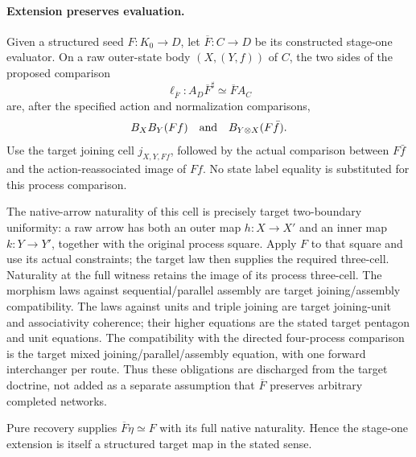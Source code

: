 \documentclass{article}
\begin{document}
\paragraph{Extension preserves evaluation.} Given a structured seed $F:K_0\to D$, let $\overline F:C\to D$ be its constructed stage-one evaluator. On a raw outer-state body $(X,(Y,f))$ of $C$, the two sides of the proposed comparison
\[
 \ell_{\overline F}:A_D\overline F^{\sharp}\simeq\overline F A_C
\]
are, after the specified action and normalization comparisons,
\[
 B_XB_Y(Ff)\quad\hbox{and}\quad B_{Y\otimes X}(F\bar f).
\]
Use the target joining cell $j_{X,Y,Ff}$, followed by the actual comparison between $F\bar f$ and the action-reassociated image of $Ff$. No state label equality is substituted for this process comparison.

The native-arrow naturality of this cell is precisely target two-boundary uniformity: a raw arrow has both an outer map $h:X\to X'$ and an inner map $k:Y\to Y'$, together with the original process square. Apply $F$ to that square and use its actual constraints; the target law then supplies the required three-cell. Naturality at the full witness retains the image of its process three-cell. The morphism laws against sequential/parallel assembly are target joining/assembly compatibility. The laws against units and triple joining are target joining-unit and associativity coherence; their higher equations are the stated target pentagon and unit equations. The compatibility with the directed four-process comparison is the target mixed joining/parallel/assembly equation, with one forward interchanger per route. Thus these obligations are discharged from the target doctrine, not added as a separate assumption that $\overline F$ preserves arbitrary completed networks.

Pure recovery supplies $\overline F\eta\simeq F$ with its full native naturality. Hence the stage-one extension is itself a structured target map in the stated sense.
\end{document}
